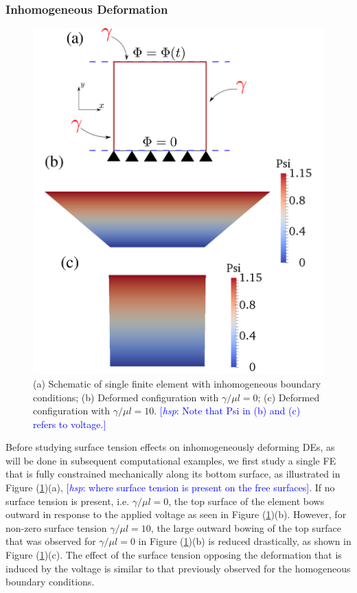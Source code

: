 \documentclass[8.5pt,twoside,twocolumn]{article}
\newcommand{\hsp}[1]{\textcolor{blue}{[\textit{hsp}: #1]}}
\begin{document}
\subsubsection{Inhomogeneous Deformation}

\begin{figure} \begin{center} 
\includegraphics[scale=0.28]{pics/inhomo3.pdf}
\caption{(a) Schematic of single finite element with inhomogeneous boundary conditions; (b) Deformed configuration with $\gamma/\mu l=0$; (c) Deformed configuration with $\gamma/\mu l=10$.  \hsp{Note that Psi in (b) and (c) refers to voltage.}}  
\label{inhomo3} \end{center} \end{figure}

Before studying surface tension effects on inhomogeneously deforming DEs, as will be done in subsequent computational examples, we first study a single FE that is fully constrained mechanically along its bottom surface, as illustrated in Figure (\ref{inhomo3})(a), \hsp{where surface tension is present on the free surfaces}.  If no surface tension is present, i.e. $\gamma/\mu l=0$, the top surface of the element bows outward in response to the applied voltage as seen in Figure (\ref{inhomo3})(b).  However, for non-zero surface tension $\gamma/\mu l=10$, the large outward bowing of the top surface that was observed for $\gamma/\mu l=0$ in Figure (\ref{inhomo3})(b) is reduced drastically, as shown in Figure (\ref{inhomo3})(c).  The effect of the surface tension opposing the deformation that is induced by the voltage is similar to that previously observed for the homogeneous boundary conditions.
\end{document}
